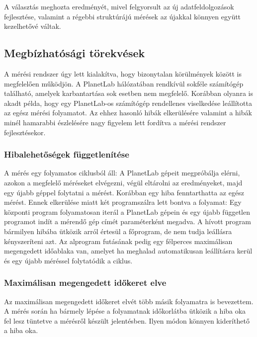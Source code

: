 A választás meghozta eredményét, mivel felgyorsult az új adatfeldolgozások fejlesztése, valamint a régebbi struktúrájú mérések az újakkal könnyen együtt kezelhetővé váltak.



\subsection{Megbízhatósági törekvések}
A mérési rendszer úgy lett kialakítva, hogy bizonytalan körülmények között is megfelelően működjön. A PlanetLab hálózatában rendkívül sokféle számítógép található, amelyek karbantartása sok esetben nem megfelelő. Korábban olyanra is akadt példa, hogy egy PlanetLab-os számítógép rendellenes viselkedése leállította az egész mérési folyamatot. Az ehhez hasonló hibák elkerülésére valamint a hibák minél hamarabbi észlelésére nagy figyelem lett fordítva a mérési rendszer fejlesztésekor.

\subsubsection*{Hibalehetőségek függetlenítése}
A mérés egy folyamatos ciklusból áll: A PlanetLab gépeit megpróbálja elérni, azokon a megfelelő méréseket elvégezni, végül eltárolni az eredményeket, majd egy újabb géppel folytatni a mérést.
Korábban egy hiba fenntarthatta az egész mérést. Ennek elkerülése miatt két programszálra lett bontva a folyamat: Egy központi program folyamatosan iterál a PlanetLab gépein és egy újabb független programot indít a mérendő gép címét paraméterként megadva. A hívott program bármilyen hibába ütközik arról értesül a főprogram, de nem tudja leállásra kényszeríteni azt. Az alprogram futásának pedig egy félperces maximálisan megengedett időablaka van, amelyet ha meghalad automatikusan leállításra kerül és egy újabb méréssel folytatódik a ciklus.

\subsubsection*{Maximálisan megengedett időkeret elve}
Az maximálisan megengedett időkeret elvét több másik folyamatra is bevezettem. A mérés során ha bármely lépése a folyamatnak időkorlátba ütközik a hiba oka fel lesz tüntetve a mérésről készült jelentésben. Ilyen módon könnyen kideríthető a hiba oka.

